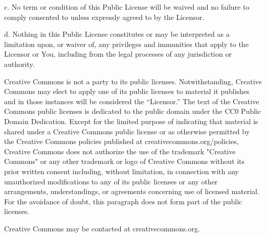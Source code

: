 c. No term or condition of this Public License will be waived and no failure to comply consented to unless expressly agreed to by the Licensor.

d. Nothing in this Public License constitutes or may be interpreted as a limitation upon, or waiver of, any privileges and immunities that apply to the Licensor or You, including from the legal processes of any jurisdiction or authority.



Creative Commons is not a party to its public licenses. Notwithstanding, Creative Commons may elect to apply one of its public licenses to material it publishes and in those instances will be considered the “\+Licensor.\+” The text of the Creative Commons public licenses is dedicated to the public domain under the CC0 Public Domain Dedication. Except for the limited purpose of indicating that material is shared under a Creative Commons public license or as otherwise permitted by the Creative Commons policies published at creativecommons.\+org/policies, Creative Commons does not authorize the use of the trademark "{}\+Creative Commons"{} or any other trademark or logo of Creative Commons without its prior written consent including, without limitation, in connection with any unauthorized modifications to any of its public licenses or any other arrangements, understandings, or agreements concerning use of licensed material. For the avoidance of doubt, this paragraph does not form part of the public licenses.

Creative Commons may be contacted at creativecommons.\+org. 